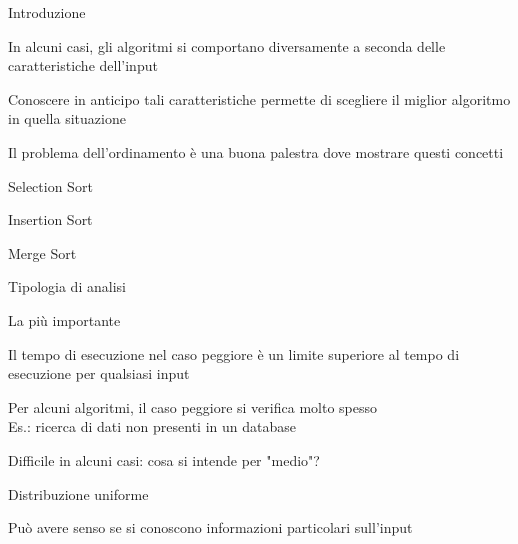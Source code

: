 \begin{frame}{Introduzione}

\begin{myboxtitle}
\BI
\item In alcuni casi, gli algoritmi si comportano diversamente a seconda delle caratteristiche dell'input
\item Conoscere in anticipo tali caratteristiche permette di scegliere il miglior algoritmo in quella situazione
\item Il problema dell'ordinamento è una buona palestra dove mostrare questi concetti
\EI
\end{myboxtitle}

\begin{myboxtitle}
\BI
\item Selection Sort
\item Insertion Sort
\item Merge Sort
\EI
\end{myboxtitle}

\end{frame}



\begin{frame}{Tipologia di analisi}

\vspace{-9pt}
\begin{myboxtitle}
\BI
\item La più importante
\item Il tempo di esecuzione nel caso peggiore è un \alert{limite superiore} al tempo di esecuzione per qualsiasi input
\item Per alcuni algoritmi, il caso peggiore si verifica molto spesso\\
Es.: ricerca di dati non presenti in un database
\EI
\end{myboxtitle}
\smallskip
\begin{myboxtitle}
\BI
\item Difficile in alcuni casi: cosa si intende per "medio"?
\item Distribuzione uniforme
\EI
\end{myboxtitle}
\smallskip
\begin{myboxtitle}
\BI
\item Può avere senso se si conoscono informazioni particolari sull'input
\EI
\end{myboxtitle}
\end{frame}

